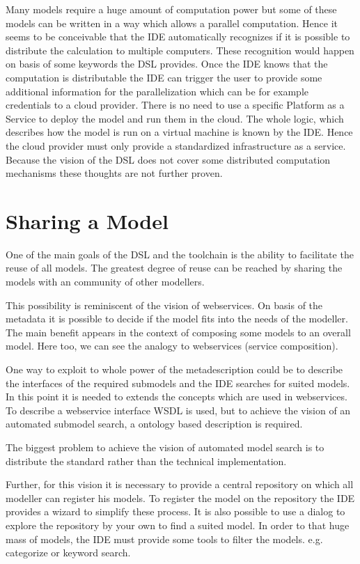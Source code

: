 Many models require a huge amount of computation power but some of these models can be written in a way which allows a parallel computation. Hence it seems to be conceivable that the IDE automatically recognizes if it is possible to distribute the calculation to multiple computers. These recognition would happen on basis of some keywords the DSL provides. Once the IDE knows that the computation is distributable the IDE can trigger the user to provide some additional information for the parallelization which can be for example credentials to a cloud provider. There is no need to use a specific Platform as a Service to deploy the model and run them in the cloud. The whole logic, which describes how the model is run on a virtual machine is known by the IDE. Hence the cloud provider must only provide a standardized infrastructure as a service. Because the vision of the DSL does not cover some distributed computation mechanisms these thoughts are not further proven.


\section{Sharing a Model}

One of the main goals of the DSL and the toolchain is the ability to facilitate the reuse of all models. The greatest degree of reuse can be reached by sharing the models with an community of other modellers.


This possibility is reminiscent of the vision of webservices. On basis of the metadata it is possible to decide if the model fits into the needs of the modeller. The main benefit appears in the context of composing some models to an overall model. Here too, we can see the analogy to webservices (service composition).


One way to exploit to whole power of the metadescription could be to describe the interfaces of the required submodels and the IDE searches for suited models. In this point it is needed to extends the concepts which are used in webservices. To describe a webservice interface WSDL is used, but to achieve the vision of an automated submodel search, a ontology based description is required.


The biggest problem to achieve the vision of automated model search is to distribute the standard rather than the technical implementation.


Further, for this vision it is necessary to provide a central repository on which all modeller can register his models. To register the model on the repository the IDE provides a wizard to simplify these process. It is also possible to use a dialog to explore the repository by your own to find a suited model. In order to that huge mass of models, the IDE must provide some tools to filter the models. e.g. categorize or keyword search.
